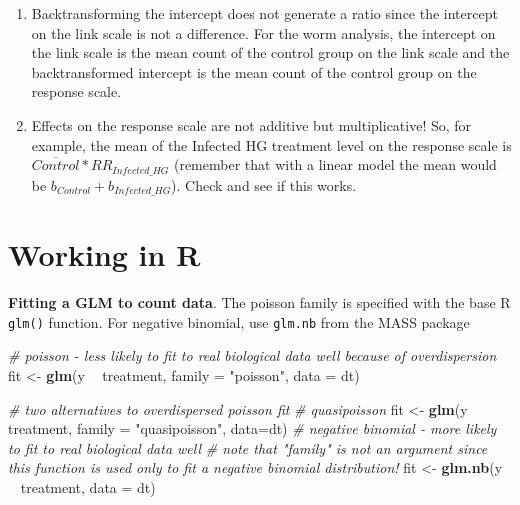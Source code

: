\documentclass[]{book}
\newenvironment{Shaded}{\begin{snugshade}}{\end{snugshade}}
\newcommand{\CommentTok}[1]{\textcolor[rgb]{0.56,0.35,0.01}{\textit{#1}}}
\newcommand{\DataTypeTok}[1]{\textcolor[rgb]{0.13,0.29,0.53}{#1}}
\newcommand{\KeywordTok}[1]{\textcolor[rgb]{0.13,0.29,0.53}{\textbf{#1}}}
\newcommand{\NormalTok}[1]{#1}
\newcommand{\OperatorTok}[1]{\textcolor[rgb]{0.81,0.36,0.00}{\textbf{#1}}}
\newcommand{\StringTok}[1]{\textcolor[rgb]{0.31,0.60,0.02}{#1}}
\begin{document}
\begin{enumerate}
\def\labelenumi{\arabic{enumi}.}
\setcounter{enumi}{1}
\item
  Backtransforming the intercept does not generate a ratio since the intercept on the link scale is not a difference. For the worm analysis, the intercept on the link scale is the mean count of the control group on the link scale and the backtransformed intercept is the mean count of the control group on the response scale.
\item
  Effects on the response scale are not additive but multiplicative! So, for example, the mean of the Infected HG treatment level on the response scale is \(\overline{Control}*RR_{Infected\_HG}\) (remember that with a linear model the mean would be \(b_{Control} + b_{Infected\_HG}\)). Check and see if this works.
\end{enumerate}

\hypertarget{working-in-r-7}{%
\section{Working in R}\label{working-in-r-7}}

\textbf{Fitting a GLM to count data}. The poisson family is specified with the base R \texttt{glm()} function. For negative binomial, use \texttt{glm.nb} from the MASS package

\begin{Shaded}
\begin{Highlighting}[]
\CommentTok{# poisson - less likely to fit to real biological data well because of overdispersion}
\NormalTok{fit <-}\StringTok{ }\KeywordTok{glm}\NormalTok{(y }\OperatorTok{~}\StringTok{ }\NormalTok{treatment, }\DataTypeTok{family =} \StringTok{"poisson"}\NormalTok{, }\DataTypeTok{data =}\NormalTok{ dt)}

\CommentTok{# two alternatives to overdispersed poisson fit}
\CommentTok{# quasipoisson}
\NormalTok{fit <-}\StringTok{ }\KeywordTok{glm}\NormalTok{(y }\OperatorTok{~}\StringTok{ }\NormalTok{treatment, }\DataTypeTok{family =} \StringTok{"quasipoisson"}\NormalTok{, }\DataTypeTok{data=}\NormalTok{dt)}
\CommentTok{# negative binomial - more likely to fit to real biological data well}
\CommentTok{# note that "family" is not an argument since this function is used only to fit a negative binomial distribution!}
\NormalTok{fit <-}\StringTok{ }\KeywordTok{glm.nb}\NormalTok{(y }\OperatorTok{~}\StringTok{ }\NormalTok{treatment, }\DataTypeTok{data =}\NormalTok{ dt)}
\end{Highlighting}
\end{Shaded}
\end{document}
